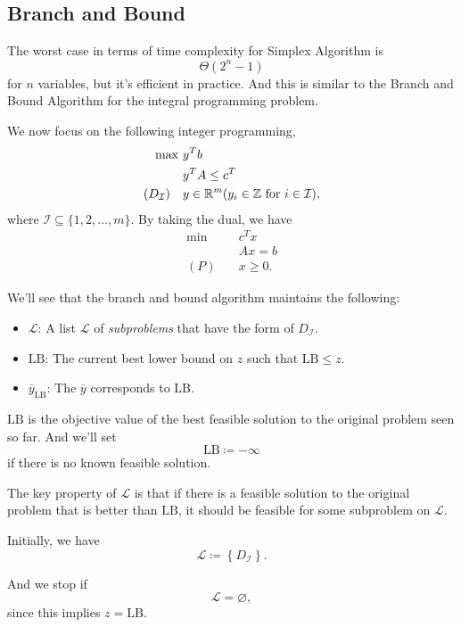 \subsection{Branch and Bound}
\begin{prev}
	The worst case in terms of time complexity for Simplex Algorithm is
	\[
		\Theta(2^n - 1)
	\]
	for \(n\) variables, but it's efficient in practice. And this is similar to
	the Branch and Bound Algorithm for the integral programming problem.
\end{prev}

We now focus on the following integer programming,
\begin{align*}
	\max~                   & y^{T}b                                                                                              \\
	                        & y^{T}A\leq c^{T}                                                                                    \\
	(D_{\mathcal{I} })\quad & y\in\mathbb{\MakeUppercase{R}}^m(y_{i}\in\mathbb{\MakeUppercase{Z}} \text{ for } i\in \mathcal{I}),
\end{align*}
where \(\mathcal{I} \subseteq \{1, 2, \ldots , m\}\). By taking the dual, we have
\begin{align*}
	\min~    & c^Tx     \\
	         & Ax = b   \\
	(P)\quad & x\geq 0.
\end{align*}

We'll see that the branch and bound algorithm maintains the following:
\begin{itemize}
	\item \(\mathcal{L} \): A list \(\mathcal{L} \) of \emph{subproblems} that have the form of \(D_{\mathcal{I} }\).
	\item \(\mathrm{LB} \): The current best lower bound on \(z\) such that \(\mathrm{LB}\leq z \).
	\item \(\overline{y}_{\mathrm{LB}}\): The \(\overline{y}\) corresponds to \(\mathrm{LB}\).
\end{itemize}

\begin{note}
	\(\mathrm{LB} \) is the objective value of the best feasible solution to the original problem seen so far. And we'll set
	\[
		\mathrm{LB} \coloneqq  -\infty
	\]
	if there is no known feasible solution.
\end{note}
\begin{remark}
	The key property of \(\mathcal{L} \) is that if there is a feasible solution to the original problem that is better than
	\(\mathrm{LB} \), it should be feasible for some subproblem on \(\mathcal{L} \).

	\par Initially, we have
	\[
		\mathcal{L} \coloneqq \left\{D_{\mathcal{I}}\right\}.
	\]

	\par And we stop if
	\[
		\mathcal{L} = \varnothing,
	\]
	since this implies \(z = \mathrm{LB} \).
\end{remark}

